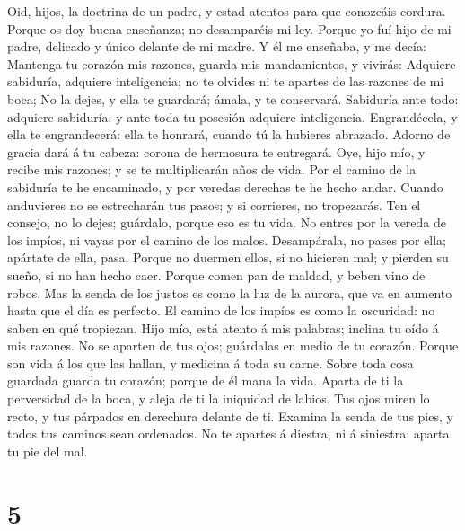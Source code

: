  Oid, hijos, la doctrina de un padre, y estad atentos para
que conozcáis cordura.  Porque os doy buena enseñanza; no
desamparéis mi ley.  Porque yo fuí hijo de mi padre,
delicado y único delante de mi madre.  Y él me enseñaba, y
me decía: Mantenga tu corazón mis razones, guarda mis mandamientos, y
vivirás:  Adquiere sabiduría, adquiere inteligencia; no te
olvides ni te apartes de las razones de mi boca;  No la
dejes, y ella te guardará; ámala, y te conservará. 
Sabiduría ante todo: adquiere sabiduría: y ante toda tu posesión
adquiere inteligencia.  Engrandécela, y ella te
engrandecerá: ella te honrará, cuando tú la hubieres abrazado.
 Adorno de gracia dará á tu cabeza: corona de hermosura te
entregará.  Oye, hijo mío, y recibe mis razones; y se te
multiplicarán años de vida.  Por el camino de la
sabiduría te he encaminado, y por veredas derechas te he hecho andar.
 Cuando anduvieres no se estrecharán tus pasos; y si
corrieres, no tropezarás.  Ten el consejo, no lo dejes;
guárdalo, porque eso es tu vida.  No entres por la vereda
de los impíos, ni vayas por el camino de los malos. 
Desampárala, no pases por ella; apártate de ella, pasa. 
Porque no duermen ellos, si no hicieren mal; y pierden su sueño, si no
han hecho caer.  Porque comen pan de maldad, y beben vino
de robos.  Mas la senda de los justos es como la luz de
la aurora, que va en aumento hasta que el día es perfecto.
 El camino de los impíos es como la oscuridad: no saben
en qué tropiezan.  Hijo mío, está atento á mis palabras;
inclina tu oído á mis razones.  No se aparten de tus
ojos; guárdalas en medio de tu corazón.  Porque son vida
á los que las hallan, y medicina á toda su carne.  Sobre
toda cosa guardada guarda tu corazón; porque de él mana la vida.
 Aparta de ti la perversidad de la boca, y aleja de ti la
iniquidad de labios.  Tus ojos miren lo recto, y tus
párpados en derechura delante de ti.  Examina la senda de
tus pies, y todos tus caminos sean ordenados.  No te
apartes á diestra, ni á siniestra: aparta tu pie del mal.

\hypertarget{section-4}{%
\section{5}\label{section-4}}

